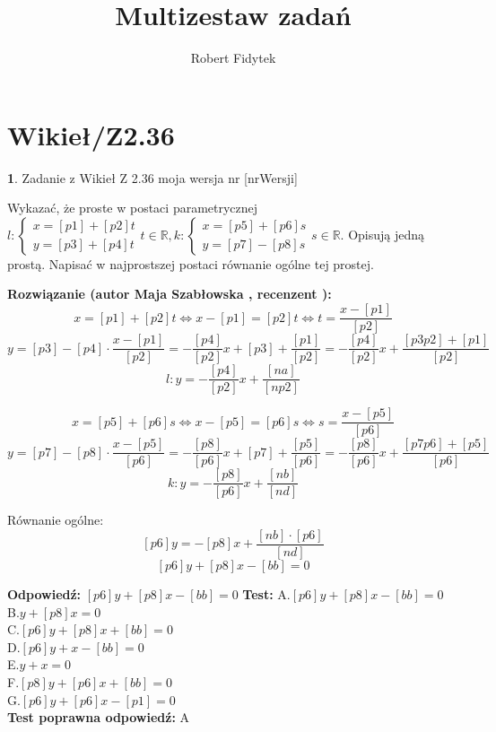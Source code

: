 \documentclass[12pt, a4paper]{article}
\title{Multizestaw zadań}
\author{Robert Fidytek}
\date{}
\theoremstyle{definition} %
\newtheorem{zad}{}
\newcommand{\kategoria}[1]{\section{#1}} %
\newcommand{\zadStart}[1]{\begin{zad}#1\newline} %
\newcommand{\zadStop}{\end{zad}}   %
\newcommand{\rozwStart}[2]{\noindent \textbf{Rozwiązanie (autor #1 , recenzent #2): }\newline} %
\newcommand{\rozwStop}{\newline}                                            %
\newcommand{\odpStart}{\noindent \textbf{Odpowiedź:}\newline}    %
\newcommand{\odpStop}{\newline}                                             %
\newcommand{\testStart}{\noindent \textbf{Test:}\newline} %
\newcommand{\testStop}{\newline} %
\newcommand{\kluczStart}{\noindent \textbf{Test poprawna odpowiedź:}\newline} %
\newcommand{\kluczStop}{\newline} %
\begin{document}
\maketitle


\kategoria{Wikieł/Z2.36}
\zadStart{Zadanie z Wikieł Z 2.36 moja wersja nr [nrWersji]}

Wykazać, że proste w postaci parametrycznej $l:\left\{ \begin{array}{ll}
x=[p1]+[p2]t \\
y=[p3]+[p4]t  
\end{array}\right.  t\in\mathbb{R},
k:\left\{ \begin{array}{ll}
x=[p5]+[p6]s \\
y=[p7]-[p8]s  
\end{array}\right.  s\in\mathbb{R}.$ Opisują jedną prostą. Napisać w najprostszej postaci równanie ogólne tej prostej.

\zadStop

\rozwStart{Maja Szabłowska}{}
$$x=[p1]+[p2]t \iff x-[p1]=[p2]t \iff t=\frac{x-[p1]}{[p2]}$$
$$ y=[p3]-[p4]\cdot\frac{x-[p1]}{[p2]}=-\frac{[p4]}{[p2]}x+[p3]+\frac{[p1]}{[p2]}=-\frac{[p4]}{[p2]}x+\frac{[p3p2]+[p1]}{[p2]}$$
$$l: y=-\frac{[p4]}{[p2]}x+\frac{[na]}{[np2]}$$

$$x=[p5]+[p6]s \iff x-[p5]=[p6]s \iff s=\frac{x-[p5]}{[p6]}$$
$$y=[p7]-[p8]\cdot\frac{x-[p5]}{[p6]}=-\frac{[p8]}{[p6]}x+[p7]+\frac{[p5]}{[p6]}=-\frac{[p8]}{[p6]}x+\frac{[p7p6]+[p5]}{[p6]}$$
$$k: y=-\frac{[p8]}{[p6]}x+\frac{[nb]}{[nd]}$$

Równanie ogólne:
$$[p6]y=-[p8]x+\frac{[nb]\cdot[p6]}{[nd]}$$
$$[p6]y+[p8]x-[bb]=0$$
\rozwStop


\odpStart
$[p6]y+[p8]x-[bb]=0$
\odpStop
\testStart
A.$[p6]y+[p8]x-[bb]=0$\\
B.$y+[p8]x=0$\\
C.$[p6]y+[p8]x+[bb]=0$\\
D.$[p6]y+x-[bb]=0$\\
E.$y+x=0$\\
F.$[p8]y+[p6]x+[bb]=0$\\
G.$[p6]y+[p6]x-[p1]=0$\\
\testStop
\kluczStart
A
\kluczStop
\end{document}
